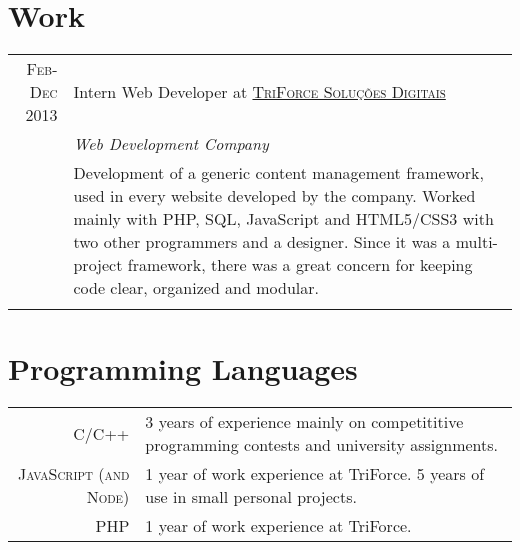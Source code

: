 \documentclass[a4paper,10pt]{article} %
\begin{document}
\section{Work}

\begin{tabular}{r|p{11cm}}
\textsc{Feb-Dec 2013} & Intern Web Developer at \textsc{\href{http://www.3force.com.br/}{TriForce Soluções Digitais}} \\
& \hfill \hfill \textit{Web Development Company} \\
& \footnotesize{Development of a generic content management framework, used in every website developed by the company. Worked mainly with PHP, SQL, JavaScript and HTML5/CSS3 with two other programmers and a designer. Since it was a multi-project framework, there was a great concern for keeping code clear, organized and modular.} \\
\multicolumn{2}{c}{} \\

\end{tabular}


\section{Programming Languages}

\begin{tabular}{rp{10cm}}
\textsc{C/C++}                 & \footnotesize{3 years of experience mainly on competititive programming contests and university assignments.} \\[0.4cm]
\textsc{JavaScript (and Node)} & \footnotesize{1 year of work experience at TriForce. 5 years of use in small personal projects.} \\[0.4cm]
\textsc{PHP}       & \footnotesize{1 year of work experience at TriForce.} \\
\end{tabular}

\end{document}
